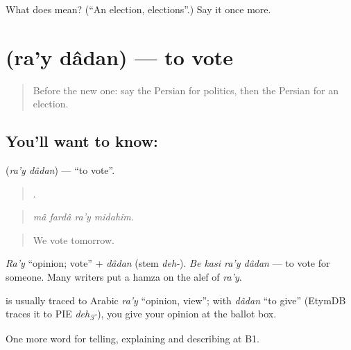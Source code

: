 \begin{tcolorbox}[breakable,colback=teal!4,colframe=teal!35!black,title={Before you move on}]
What does  mean? (\textquotedblleft{}An election, elections\textquotedblright{}.) Say it once more.
\end{tcolorbox}
\section[\texorpdfstring{\fa{رای} \fa{دادن} (ra'y dâdan)}{رای دادن (ra'y dâdan)}]{  (ra'y dâdan) — to vote}

\label{lesson:FA-C409-ray-dadan}



\begin{quote}
Before the new one: say the Persian for politics, then the Persian for an election.
\end{quote}

\subsection*{You'll want to know:  }
\textbf{ } (\emph{ra'y dâdan}) — \textquotedblleft{}to vote\textquotedblright{}.

\begin{quote}
   .
\end{quote}

\begin{quote}
\emph{mâ fardâ ra'y midahim.}
\end{quote}

\begin{quote}
We vote tomorrow.
\end{quote}

\emph{Ra'y} \textquotedblleft{}opinion; vote\textquotedblright{} + \emph{dâdan} (stem \emph{deh-}). \emph{Be kasi ra'y dâdan} — to vote for someone. Many writers put a hamza on the alef of \emph{ra'y}.

\begin{cousinweb}
\textbf{} is usually traced to Arabic \emph{ra'y} \textquotedblleft{}opinion, view\textquotedblright{}; with \emph{dâdan} \textquotedblleft{}to give\textquotedblright{} (EtymDB traces it to PIE \emph{deh\textsubscript{3}-}), you give your opinion at the ballot box.
\end{cousinweb}

\begin{grammarlens}[title={What you've built}]
One more word for telling, explaining and describing at B1.
\end{grammarlens}


